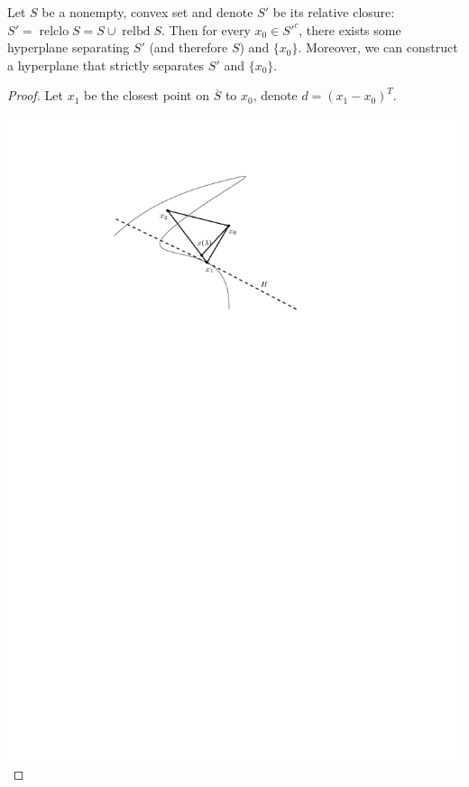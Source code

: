 \begin{theorem}
\label{thr:hst-closed-pt}
  Let \( S \) be a nonempty, convex set and denote \( S' \) be its relative
  closure: \( S' = \operatorname{relclo} S = S \cup \operatorname{relbd} S \).
  Then for every \( x_{0} \in S'^{c} \),
  there exists some hyperplane separating \( S' \) (and therefore \( S \))
  and \( \{x_{0}\}   \). Moreover, we can construct a hyperplane that strictly
  separates \( S' \) and \( \{x_{0}\}   \).
\end{theorem}

\begin{proof}
  Let \( x_{1} \) be the closest point on \( \overline{S} \) to \( x_{0} \),
  denote \( d = (x_{1}-x_{0})^{T}\).

  \includegraphics[scale=1.5]{figures/1696779691}


\end{proof}
